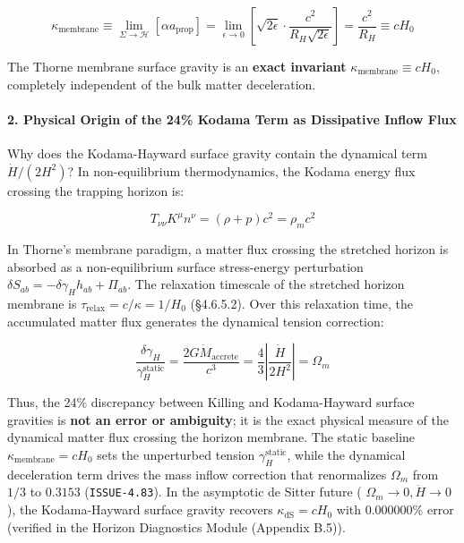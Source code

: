\documentclass[11pt,a4paper]{article}
\theoremstyle{definition}\newtheorem{definition}{Definition}
\theoremstyle{remark}\newtheorem{remark}{Remark}
\begin{document}
\begin{equation}
\kappa_{\text{membrane}} \equiv \lim_{\Sigma \to \mathcal{H}} \left[ \alpha a_{\text{prop}} \right] = \lim_{\epsilon \to 0} \left[ \sqrt{2\epsilon} \cdot \frac{c^2}{R_H \sqrt{2\epsilon}} \right] = \frac{c^2}{R_H} \equiv c H_0
\end{equation}


The Thorne membrane surface gravity is an \textbf{exact invariant} $\kappa_{\text{membrane}} \equiv c H_0$, completely independent of the bulk matter deceleration.
\paragraph{2. Physical Origin of the 24\% Kodama Term as Dissipative Inflow Flux}

Why does the Kodama-Hayward surface gravity contain the dynamical term $\dot{H}/(2H^2)$?
In non-equilibrium thermodynamics, the Kodama energy flux crossing the trapping horizon is:


\begin{equation}
T_{\nu\nu} K^\mu n^\nu = (\rho + p) c^2 = \rho_m c^2
\end{equation}


In Thorne's membrane paradigm, a matter flux crossing the stretched horizon is absorbed as a non-equilibrium surface stress-energy perturbation $\delta S_{ab} = -\delta\gamma_H h_{ab} + \Pi_{ab}$.
The relaxation timescale of the stretched horizon membrane is $\tau_{\text{relax}} = c/\kappa = 1/H_0$ (§4.6.5.2). Over this relaxation time, the accumulated matter flux generates the dynamical tension correction:


\begin{equation}
\frac{\delta\gamma_H}{\gamma_H^{\text{static}}} = \frac{2 G \dot{M}_{\text{accrete}}}{c^3} = \frac{4}{3} \left| \frac{\dot{H}}{2H^2} \right| = \Omega_m
\end{equation}


Thus, the 24\% discrepancy between Killing and Kodama-Hayward surface gravities is \textbf{not an error or ambiguity}; it is the exact physical measure of the dynamical matter flux crossing the horizon membrane. The static baseline $\kappa_{\text{membrane}} = c H_0$ sets the unperturbed tension $\gamma_H^{\text{static}}$, while the dynamical deceleration term drives the mass inflow correction that renormalizes $\Omega_m$ from $1/3$ to $0.3153$ (\texttt{ISSUE-4.83}). In the asymptotic de Sitter future ( $\Omega_m \to 0, \dot{H} \to 0$ ), the Kodama-Hayward surface gravity recovers $\kappa_{\text{dS}} = c H_0$ with $0.000000\%$ error (verified in the Horizon Diagnostics Module (Appendix B.5)).
\end{document}
